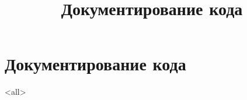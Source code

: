 
\title[Toolchain]{Документирование кода}


\begin{frame}
	\frametitle{}
	\titlepage
	\vspace{-0.5cm}
	\begin{center}
	\end{center}
\end{frame}

\begin{frame}
	\tableofcontents
\end{frame}




\section{Документирование кода}

\mode<all>{}




